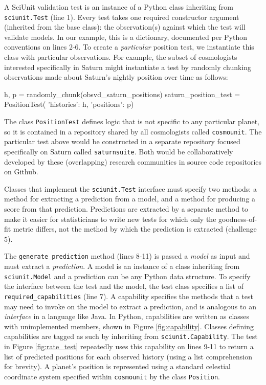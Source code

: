 \documentclass[9pt]{sig-alternate}
\newcommand{\verbx}[1]{\lstinline{#1}}
\begin{document}
A {SciUnit} validation test is an {instance} of a Python class inheriting from  \verbx{sciunit.Test} (line 1). 
Every test takes one required constructor argument (inherited from the base class): the observation(s) against which the test will validate models.
In our example, this is a dictionary, documented per Python conventions on lines 2-6. 
To create a \emph{particular} position test, we instantiate this class with particular observations. 
For example, the subset of cosmologists interested specifically in Saturn might instantiate a test by randomly chunking observations made about Saturn's nightly position over time as follows:
\vspace{-3px}
\begin{python}
  h, p = randomly_chunk(obsvd_saturn_positions)
  saturn_position_test = PositionTest(
    {'histories': h, 'positions': p})
\end{python}
\vspace{-5px}
The class \verb|PositionTest| defines logic that is not specific to any particular planet, so it is contained in a repository shared by all cosmologists called \verbx{cosmounit}. The particular test above would be constructed in a separate repository focused specifically on Saturn called \verbx{saturnsuite}. Both would be collaboratively developed by these (overlapping) research communities in source code repositories on Github.

Classes that implement the \verbx{sciunit.Test} interface must specify two methods: a method for extracting a prediction from a model, and a method for producing a score from that prediction. Predictions are extracted by a separate method to make it easier for statisticians to write new tests for which only the goodness-of-fit metric differs, not the method by which the prediction is extracted (challenge 5).

The \verbx{generate_prediction} method (lines 8-11) is passed a \emph{model} as input and must extract a \emph{prediction}. A model is an instance of a class inheriting from \verbx{sciunit.Model} and a prediction can be any Python data structure. To specify the interface between the test and the model, the test class specifies a list of \verbx{required_capabilities} (line 7). 
A capability specifies the methods that a test may need to invoke on the model to extract a prediction, and is analogous to an \emph{interface} in a language like Java. 
In Python, capabilities are written as classes with unimplemented members, shown in Figure \ref{fig:capability}. 
Classes defining capabilities are tagged as such by inheriting from \verbx{sciunit.Capability}. The test in Figure \ref{fig:rate_test} repeatedly uses this capability on lines 9-11 to return a list of predicted positions for each observed history (using a list comprehension for brevity).  A planet's position is represented using a standard celestial coordinate system specified within \verbx{cosmounit} by the class \verbx{Position}. 
\end{document}
